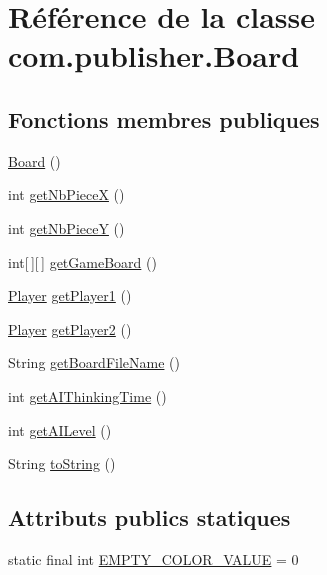 \hypertarget{classcom_1_1publisher_1_1Board}{\section{Référence de la classe com.\-publisher.\-Board}
\label{classcom_1_1publisher_1_1Board}
}
\subsection*{Fonctions membres publiques}
\begin{DoxyCompactItemize}
\item 
\hyperlink{classcom_1_1publisher_1_1Board_a2ff768a78f670131251fd8dbe243d4b2}{Board} ()
\item 
int \hyperlink{classcom_1_1publisher_1_1Board_ac82c3a778cf1939ec0a0ed9d4a46aedc}{get\-Nb\-Piece\-X} ()
\item 
int \hyperlink{classcom_1_1publisher_1_1Board_a50d7b5cc3e5a522c47fc1adbc30cf7c6}{get\-Nb\-Piece\-Y} ()
\item 
int\mbox{[}$\,$\mbox{]}\mbox{[}$\,$\mbox{]} \hyperlink{classcom_1_1publisher_1_1Board_af3f0a0735fa77870f53f3b6d3735ae11}{get\-Game\-Board} ()
\item 
\hyperlink{classcom_1_1publisher_1_1Player}{Player} \hyperlink{classcom_1_1publisher_1_1Board_a4c08342abe16cf4cd2d7850c18da0ad4}{get\-Player1} ()
\item 
\hyperlink{classcom_1_1publisher_1_1Player}{Player} \hyperlink{classcom_1_1publisher_1_1Board_a9aa650a3ebc7700b78ab3c7f7180054b}{get\-Player2} ()
\item 
String \hyperlink{classcom_1_1publisher_1_1Board_a8b0fb1dcaabc0cf055353fa2b02c6cc3}{get\-Board\-File\-Name} ()
\item 
int \hyperlink{classcom_1_1publisher_1_1Board_a563187b1347076eaa068bb1e94440181}{get\-A\-I\-Thinking\-Time} ()
\item 
int \hyperlink{classcom_1_1publisher_1_1Board_a0e9c43fcfaf7a3c5a923d441a3e8707d}{get\-A\-I\-Level} ()
\item 
String \hyperlink{classcom_1_1publisher_1_1Board_a9718b99d1885ed6901f7b5ceecdd50fd}{to\-String} ()
\end{DoxyCompactItemize}
\subsection*{Attributs publics statiques}
\begin{DoxyCompactItemize}
\item 
static final int \hyperlink{classcom_1_1publisher_1_1Board_a134744db943b8dddcf57e785b50edaf7}{E\-M\-P\-T\-Y\-\_\-\-C\-O\-L\-O\-R\-\_\-\-V\-A\-L\-U\-E} = 0
\end{DoxyCompactItemize}
